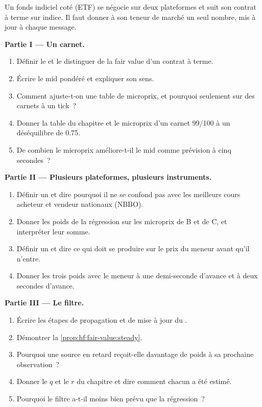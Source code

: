 \begin{problem}\label{pb:hf:fair-value:1}
Un fonds indiciel coté (ETF) se négocie sur deux plateformes et suit son contrat à terme sur indice. Il faut donner à son teneur de marché un seul nombre, mis à jour à chaque message.

\medskip\noindent\textbf{Partie I --- Un carnet.}
\begin{enumerate}
\item Définir le  et le distinguer de la fair value d'un contrat à terme.
\item Écrire le mid pondéré et expliquer son sens.
\item Comment ajuste-t-on une table de microprix, et pourquoi seulement sur des carnets à un tick~?
\item Donner la table du chapitre et le microprix d'un carnet 99/100 à un déséquilibre de 0.75.
\item De combien le microprix améliore-t-il le mid comme prévision à cinq secondes~?
\end{enumerate}

\medskip\noindent\textbf{Partie II --- Plusieurs plateformes, plusieurs instruments.}
\begin{enumerate}[resume]
\item Définir un  et dire pourquoi il ne se confond pas avec les meilleurs cours acheteur et vendeur nationaux (NBBO).
\item Donner les poids de la régression sur les microprix de B et de C, et interpréter leur somme.
\item Définir un  et dire ce qui doit se produire sur le prix du meneur avant qu'il n'entre.
\item Donner les trois poids avec le meneur à une demi-seconde d'avance et à deux secondes d'avance.
\end{enumerate}

\medskip\noindent\textbf{Partie III --- Le filtre.}
\begin{enumerate}[resume]
\item Écrire les étapes de propagation et de mise à jour du .
\item Démontrer la \cref{prop:hf:fair-value:steady}.
\item Pourquoi une source en retard reçoit-elle davantage de poids à sa prochaine observation~?
\item Donner le $q$ et le $r$ du chapitre et dire comment chacun a été estimé.
\item Pourquoi le filtre a-t-il moins bien prévu que la régression~?
\end{enumerate}


\end{problem}
